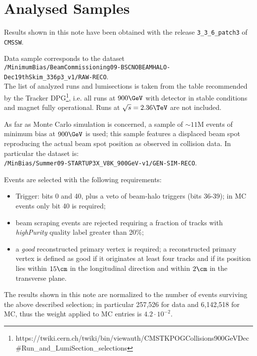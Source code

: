 \section{Analysed Samples}
\label{sample}

Results shown in this note have been obtained with the release {\tt 3\_3\_6\_patch3} of {\tt CMSSW}.

Data sample corresponds to the dataset\\
{\tt /MinimumBias/BeamCommissioning09-BSCNOBEAMHALO-Dec19thSkim\_336p3\_v1/RAW-RECO}.\\
The list of analyzed runs and lumisections is taken from the table recommended by the Tracker 
DPG\footnote{https://twiki.cern.ch/twiki/bin/viewauth/CMSTKPOGCollisions900GeVDec\#Run\_and\_LumiSection\_selections},
i.e. all runs at $900\GeV$ with detector in stable conditions and magnet fully operational. 
Runs at $\sqrt{s}=2.36\TeV$ are not included.

As far as Monte Carlo simulation is concerned, a sample of $\sim11$M events of minimum bias at $900\GeV$ is used; this sample features a displaced beam spot reproducing the actual beam spot position as observed in collision data. In particular the dataset is:\\
{\tt /MinBias/Summer09-STARTUP3X\_V8K\_900GeV-v1/GEN-SIM-RECO}.

Events are selected with the following requirements:
\begin{itemize}
\item Trigger: bits 0 and 40, plus a veto of beam-halo triggers (bits 36-39); in MC events only bit 40 is required;
\item beam scraping events are rejected requiring a fraction of tracks with \emph{highPurity} quality label greater than 20\%;
\item a {\em good} reconstructed primary vertex is required; a reconstructed primary vertex is defined as good if it originates at least four tracks and if its position lies within $15\cm$ in the longitudinal 
direction and within $2\cm$ in the transverse plane.
\end{itemize}

The results shown in this note are normalized to the number of events surviving the above described selection; in particular 257,526 for data and 6,142,518 for MC, thus the weight applied to MC entries is $4.2\cdot 10^{-2}$. 
